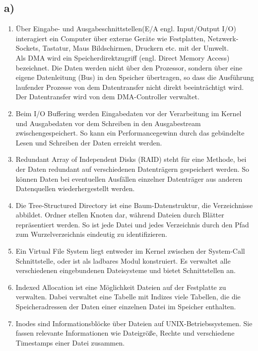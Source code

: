 \documentclass[numbers=noendperiod]{scrartcl}
\begin{document}
\subsection*{a)}
\begin{enumerate}
	\item Über Eingabe- und Ausgabeschnittstellen(E/A engl. Input/Output I/O) interagiert ein Computer über externe Geräte wie Festplatten, Netzwerk-Sockets, Tastatur, Maus Bildschirmen, Druckern etc. mit der Umwelt.\\
	Als DMA wird ein Speicherdirektzugriff (engl. Direct Memory Access) bezeichnet. Die Daten werden nicht über den Prozessor, sondern über eine eigene Datenleitung (Bus) in den Speicher übertragen, so dass die Ausführung laufender Prozesse von dem Datentransfer nicht direkt beeinträchtigt wird. Der Datentransfer wird von dem DMA-Controller verwaltet.
	\item Beim I/O Buffering werden Eingabedaten vor der Verarbeitung im Kernel und Ausgabedaten vor dem Schreiben in den Ausgabestream zwischengespeichert. So kann ein Performancegewinn durch das gebündelte Lesen und Schreiben der Daten erreicht werden.  
	\item Redundant Array of Independent Disks (RAID) steht für eine Methode, bei der Daten redundant auf verschiedenen Datenträgern gespeichert werden. So können Daten bei eventuellen Ausfällen einzelner Datenträger aus anderen Datenquellen wiederhergestellt werden. 
	\item Die Tree-Structured Directory ist eine Baum-Datenstruktur, die Verzeichnisse abbildet. Ordner stellen Knoten dar, während Dateien durch Blätter repräsentiert werden. So ist jede Datei und jedes Verzeichnis durch den Pfad zum Wurzelverzeichnis eindeutig zu identifizieren.
	\item Ein Virtual File System liegt entweder im Kernel zwischen der System-Call Schnittstelle, oder ist als ladbares Modul konstruiert. Es verwaltet alle verschiedenen eingebundenen Dateisysteme und bietet Schnittstellen an.  
	\item Indexed Allocation ist eine Möglichkeit Dateien auf der Festplatte zu verwalten. Dabei verwaltet eine Tabelle mit Indizes viele Tabellen, die die Speicheradressen der Daten einer einzelnen Datei im Speicher enthalten.
	\item Inodes sind Informationsblöcke über Dateien auf UNIX-Betriebssystemen. Sie fassen relevante Informationen wie Dateigröße, Rechte und verschiedene Timestamps einer Datei zusammen.
	
	   
\end{enumerate}
\end{document}
